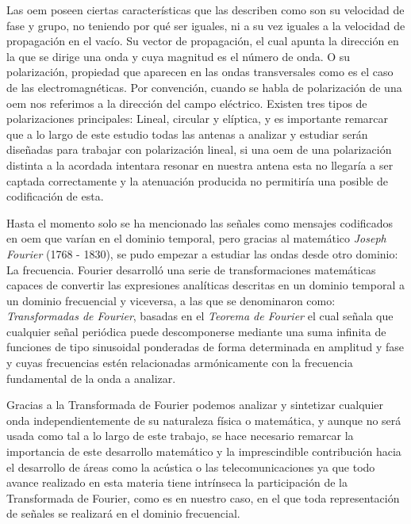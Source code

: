 \par Las \gls{oem} poseen ciertas características que las describen como son su velocidad de fase y grupo, no teniendo por qué  ser iguales, ni a su vez iguales a la velocidad de propagación en el vacío. Su vector de propagación, el cual apunta la dirección en la que se dirige una onda y cuya magnitud es el número de onda. O su polarización, propiedad que aparecen en las ondas transversales como es el caso de las electromagnéticas. Por convención, cuando se habla de polarización de una \gls{oem} nos referimos a la dirección del campo eléctrico. Existen tres tipos de polarizaciones principales: Lineal, circular y elíptica, y es importante remarcar que a lo largo de este estudio todas las antenas a analizar y estudiar serán diseñadas para trabajar con polarización lineal, si una \gls{oem} de una polarización distinta a la acordada intentara resonar en nuestra antena esta no llegaría a ser captada correctamente y la atenuación producida no permitiría una posible de codificación de esta.
\\
\par Hasta el momento solo se ha mencionado las señales como mensajes codificados en \gls{oem} que varían en el dominio temporal, pero gracias al matemático \textit{Joseph Fourier} (1768 - 1830), se pudo empezar a estudiar las ondas desde otro dominio: La frecuencia. Fourier desarrolló una serie de transformaciones matemáticas capaces de convertir las expresiones analíticas descritas en un dominio temporal a un dominio frecuencial y viceversa, a las que se denominaron como: \textit{Transformadas de Fourier}, basadas en el \textit{Teorema de Fourier} el cual señala que cualquier señal periódica puede descomponerse mediante una suma infinita de funciones de tipo sinusoidal ponderadas de forma determinada en amplitud y fase y cuyas frecuencias estén relacionadas armónicamente con la frecuencia fundamental de la onda a analizar. 
\\
\par Gracias a la Transformada de Fourier podemos analizar y sintetizar cualquier onda independientemente de su naturaleza física o matemática, y aunque no será usada como tal a lo largo de este trabajo, se hace necesario remarcar la importancia de este desarrollo matemático y la imprescindible contribución hacia el desarrollo de áreas como la acústica o las telecomunicaciones ya que todo avance realizado en esta materia tiene intrínseca la participación de la Transformada de Fourier, como es en nuestro caso, en el que toda representación de señales se realizará en el dominio frecuencial. 
